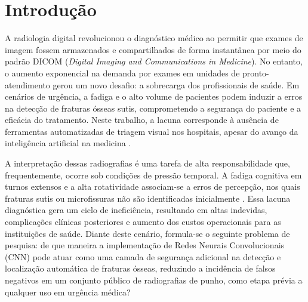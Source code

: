 \documentclass[12pt,oneside,a4paper,chapter=TITLE,section=TITLE,sumario=tradicional]{abntex2}
\begin{document}
\listadetabelas

\sumario

\textual

\chapter{Introdução}
\label{cap:introducao}

A radiologia digital revolucionou o diagnóstico médico ao permitir que exames de imagem fossem armazenados e compartilhados de forma instantânea por meio do padrão DICOM (\textit{Digital Imaging and Communications in Medicine}). No entanto, o aumento exponencial na demanda por exames em unidades de pronto-atendimento gerou um novo desafio: a sobrecarga dos profissionais de saúde. Em cenários de urgência, a fadiga e o alto volume de pacientes podem induzir a erros na detecção de fraturas ósseas sutis, comprometendo a segurança do paciente e a eficácia do tratamento. Neste trabalho, a lacuna corresponde à ausência de ferramentas automatizadas de triagem visual nos hospitais, apesar do avanço da inteligência artificial na medicina \cite{topol2019,kim2020}.

A interpretação dessas radiografias é uma tarefa de alta responsabilidade que, frequentemente, ocorre sob condições de pressão temporal. A fadiga cognitiva em turnos extensos e a alta rotatividade associam-se a erros de percepção, nos quais fraturas sutis ou microfissuras não são identificadas inicialmente \cite{kim2020,topol2019}. Essa lacuna diagnóstica gera um ciclo de ineficiência, resultando em altas indevidas, complicações clínicas posteriores e aumento dos custos operacionais para as instituições de saúde. Diante deste cenário, formula-se o seguinte problema de pesquisa: de que maneira a implementação de Redes Neurais Convolucionais (CNN) pode atuar como uma camada de segurança adicional na detecção e localização automática de fraturas ósseas, reduzindo a incidência de falsos negativos em um conjunto público de radiografias de punho, como etapa prévia a qualquer uso em urgência médica?
\end{document}
